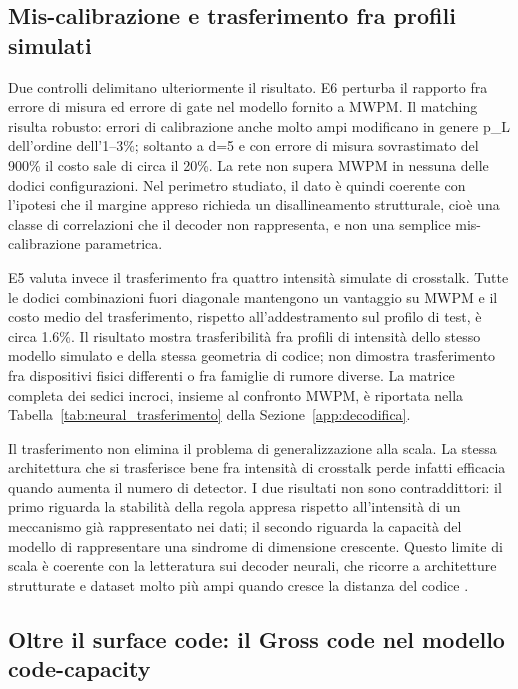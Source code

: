\subsection{Mis-calibrazione e trasferimento fra profili simulati}\label{sec:finale_5_3_7}

Due controlli delimitano ulteriormente il risultato. E6 perturba il rapporto fra errore di misura ed errore di gate nel modello fornito a MWPM. Il matching risulta robusto: errori di calibrazione anche molto ampi modificano in genere p\_L dell'ordine dell'1--3\%; soltanto a d=5 e con errore di misura sovrastimato del 900\% il costo sale di circa il 20\%. La rete non supera MWPM in nessuna delle dodici configurazioni. Nel perimetro studiato, il dato è quindi coerente con l'ipotesi che il margine appreso richieda un disallineamento strutturale, cioè una classe di correlazioni che il decoder non rappresenta, e non una semplice mis-calibrazione parametrica.

E5 valuta invece il trasferimento fra quattro intensità simulate di crosstalk. Tutte le dodici combinazioni fuori diagonale mantengono un vantaggio su MWPM e il costo medio del trasferimento, rispetto all'addestramento sul profilo di test, è circa 1.6\%. Il risultato mostra trasferibilità fra profili di intensità dello stesso modello simulato e della stessa geometria di codice; non dimostra trasferimento fra dispositivi fisici differenti o fra famiglie di rumore diverse. La matrice completa dei sedici incroci, insieme al confronto MWPM, è riportata nella Tabella~\ref{tab:neural_trasferimento} della Sezione~\ref{app:decodifica}.

Il trasferimento non elimina il problema di generalizzazione alla scala. La stessa architettura che si trasferisce bene fra intensità di crosstalk perde infatti efficacia quando aumenta il numero di detector. I due risultati non sono contraddittori: il primo riguarda la stabilità della regola appresa rispetto all'intensità di un meccanismo già rappresentato nei dati; il secondo riguarda la capacità del modello di rappresentare una sindrome di dimensione crescente. Questo limite di scala è coerente con la letteratura sui decoder neurali, che ricorre a architetture strutturate e dataset molto più ampi quando cresce la distanza del codice \cite{alphaqubit2024,torlaiMelko2017,yan2026}.

\subsection{Oltre il surface code: il Gross code nel modello code-capacity}\label{sec:finale_5_3_8}


